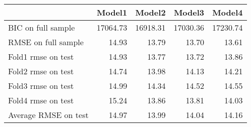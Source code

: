 \begin{tabular}{lrrrr}
\toprule
{} &    Model1 &    Model2 &    Model3 &    Model4 \\
\midrule
BIC on full sample   &  17064.73 &  16918.31 &  17030.36 &  17230.74 \\
RMSE on full sample  &     14.93 &     13.79 &     13.70 &     13.61 \\
Fold1 rmse on test   &     14.93 &     13.77 &     13.72 &     13.86 \\
Fold2 rmse on test   &     14.74 &     13.98 &     14.13 &     14.21 \\
Fold3 rmse on test   &     14.99 &     14.34 &     14.52 &     14.55 \\
Fold4 rmse on test   &     15.24 &     13.86 &     13.81 &     14.03 \\
Average RMSE on test &     14.97 &     13.99 &     14.04 &     14.16 \\
\bottomrule
\end{tabular}
